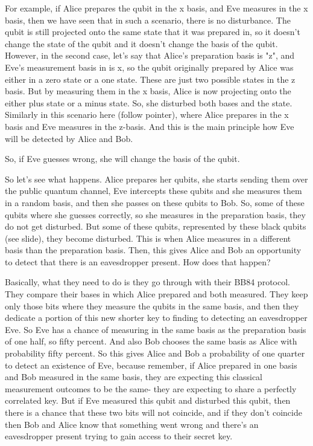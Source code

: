 For example, if Alice prepares the qubit in the x basis, and Eve measures in the x basis, then we have seen that in such a scenario, there is no disturbance. The qubit is still projected onto the same state that it was prepared in, so it doesn't change the state of the qubit and it doesn't change the basis of the qubit. However, in the second case, let's say that Alice's preparation basis is "z", and Eve's measurement basis in is x, so the qubit originally prepared by Alice was either in a zero state or a one state. These are just two possible states in the z basis. But by measuring them in the x basis, Alice is now projecting onto the either plus state or a minus state. So, she disturbed both bases and the state. Similarly in this scenario here (follow pointer), where Alice prepares in the x basis and Eve measures in the z-basis. And this is the main principle how Eve will be detected by Alice and Bob.

So, if Eve guesses wrong, she will change the basis of the qubit.

So let's see what happens. Alice prepares her qubits, she starts sending them over the public quantum channel, Eve intercepts these qubits and she measures them in a random basis, and then she passes on these qubits to Bob. So, some of these qubits where she guesses correctly, so she measures in the preparation basis, they do not get disturbed. But some of these qubits, represented by these black qubits (see slide), they become disturbed. This is when Alice measures in a different basis than the preparation basis. Then, this gives Alice and Bob an opportunity to detect that there is an eavesdropper present. How does that happen?

Basically, what they need to do is they go through with their BB84 protocol. They compare their bases in which Alice prepared and both measured. They keep only those bits where they measure the qubits in the same basis, and then they dedicate a portion of this new shorter key to finding to detecting an eavesdropper Eve. So Eve has a chance of measuring in the same basis as the preparation basis of one half, so fifty percent. And also Bob chooses the same basis as Alice with probability fifty percent. So this gives Alice and Bob a probability of one quarter to detect an existence of Eve, because remember, if Alice prepared in one basis and Bob measured in the same basis, they are expecting this classical measurement outcomes to be the same- they are expecting to share a perfectly correlated key. But if Eve measured this qubit and disturbed this qubit, then there is a chance that these two bits will not coincide, and if they don't coincide then Bob and Alice know that something went wrong and there's an eavesdropper present trying to gain access to their secret key.

